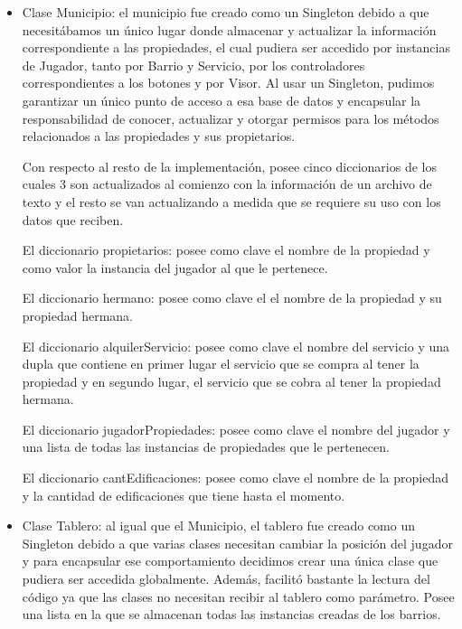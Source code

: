 \documentclass[titlepage,a4paper]{article}
\begin{document}
\begin{itemize}
\item 
Clase Municipio: el municipio fue creado como un Singleton debido a que necesitábamos un único lugar donde almacenar y actualizar la información correspondiente a las propiedades, el cual pudiera ser accedido por instancias de Jugador, tanto por Barrio y Servicio, por los controladores correspondientes a los botones y por Visor. Al usar un Singleton, pudimos garantizar un único punto de acceso a esa base de datos y encapsular la responsabilidad de conocer, actualizar y otorgar permisos para los métodos relacionados a las propiedades y sus propietarios.

	Con respecto al resto de la implementación, posee cinco diccionarios de los cuales 3 son actualizados al comienzo con la información de un archivo de texto y el resto se van actualizando a medida que se requiere su uso con los datos que reciben.
    
	El diccionario propietarios: posee como clave el nombre de la propiedad y como valor la instancia del jugador al que le pertenece.
    
	El diccionario hermano: posee como clave el el nombre de la propiedad y su propiedad hermana.
    
	El diccionario alquilerServicio: posee como clave el nombre del servicio y una dupla que contiene en primer lugar el servicio que se compra al tener la propiedad y en segundo lugar, el servicio que se cobra al tener la propiedad hermana.
    
	El diccionario jugadorPropiedades: posee como clave el nombre del jugador y una lista de todas las instancias de propiedades que le pertenecen.
    
	El diccionario cantEdificaciones: posee como clave el nombre de la propiedad y la cantidad de edificaciones que tiene hasta el momento.
\end{itemize}

\begin{itemize}
\item 
Clase Tablero: al igual que el Municipio, el tablero fue creado como un Singleton debido a que varias clases necesitan cambiar la posición del jugador y para encapsular ese comportamiento decidimos crear una única clase que pudiera ser accedida globalmente. Además, facilitó bastante la lectura del código ya que las clases no necesitan recibir al tablero como parámetro. Posee una lista en la que se almacenan todas las instancias creadas de los barrios.
\end{itemize}
\end{document}
